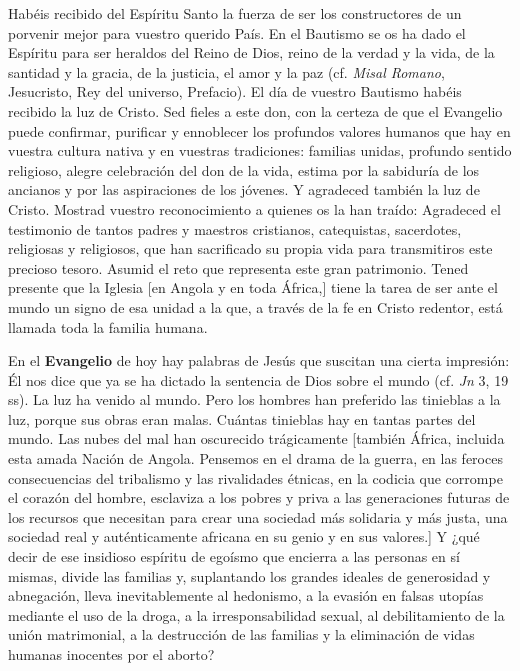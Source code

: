 \begin{body}
 Habéis recibido del Espíritu Santo la fuerza de ser los constructores de un porvenir mejor para vuestro querido País. En el Bautismo se os ha dado el Espíritu para ser heraldos del Reino de Dios, reino de la verdad y la vida, de la santidad y la gracia, de la justicia, el amor y la paz (cf. \textit{Misal Romano}, Jesucristo, Rey del universo, Prefacio). El día de vuestro Bautismo habéis recibido la luz de Cristo. Sed fieles a este don, con la certeza de que el Evangelio puede confirmar, purificar y ennoblecer los profundos valores humanos que hay en vuestra cultura nativa y en vuestras tradiciones: familias unidas, profundo sentido religioso, alegre celebración del don de la vida, estima por la sabiduría de los ancianos y por las aspiraciones de los jóvenes. Y agradeced también la luz de Cristo. Mostrad vuestro reconocimiento a quienes os la han traído:  Agradeced el testimonio de tantos padres y maestros cristianos, catequistas, sacerdotes, religiosas y religiosos, que han sacrificado su propia vida para transmitiros este precioso tesoro. Asumid el reto que representa este gran patrimonio. Tened presente que la Iglesia [en Angola y en toda África,] tiene la tarea de ser ante el mundo un signo de esa unidad a la que, a través de la fe en Cristo redentor, está llamada toda la familia humana.

\newpage 
En el \textbf{Evangelio} de hoy hay palabras de Jesús que suscitan una cierta impresión: Él nos dice que ya se ha dictado la sentencia de Dios sobre el mundo (cf. \textit{Jn} 3, 19 ss). La luz ha venido al mundo. Pero los hombres han preferido las tinieblas a la luz, porque sus obras eran malas. Cuántas tinieblas hay en tantas partes del mundo. Las nubes del mal han oscurecido trágicamente [también África, incluida esta amada Nación de Angola. Pensemos en el drama de la guerra, en las feroces consecuencias del tribalismo y las rivalidades étnicas, en la codicia que corrompe el corazón del hombre, esclaviza a los pobres y priva a las generaciones futuras de los recursos que necesitan para crear una sociedad más solidaria y más justa, una sociedad real y auténticamente africana en su genio y en sus valores.] Y ¿qué decir de ese insidioso espíritu de egoísmo que encierra a las personas en sí mismas, divide las familias y, suplantando los grandes ideales de generosidad y abnegación, lleva inevitablemente al hedonismo, a la evasión en falsas utopías mediante el uso de la droga, a la irresponsabilidad sexual, al debilitamiento de la unión matrimonial, a la destrucción de las familias y la eliminación de vidas humanas inocentes por el aborto?


\end{body}
